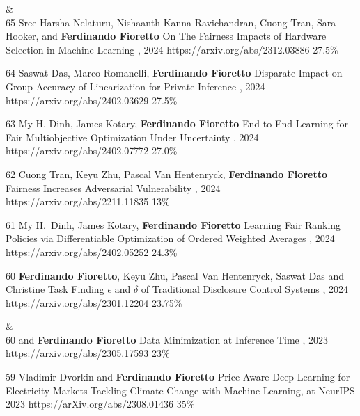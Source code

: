 \begin{pubs}

{}&\nemph{\rule{0.5\linewidth}{0.5pt}}\\[1em]

\confentry
	{65}
	{\student{} Sree Harsha Nelaturu, \student{} Nishaanth Kanna Ravichandran, \student{} Cuong Tran, Sara Hooker, and {\bf Ferdinando Fioretto}}
	{On The Fairness Impacts of Hardware Selection in Machine Learning}	
	{\procICML, 2024}
	{https://arxiv.org/abs/2312.03886}
	{27.5\%}

\confentry
	{64}
	{\student{} Saswat Das, Marco Romanelli, {\bf Ferdinando Fioretto}}
	{Disparate Impact on Group Accuracy of Linearization for Private Inference}
	{\procICML, 2024}
	{https://arxiv.org/abs/2402.03629}
	{27.5\%}

\confentry
	{63}
	{\student{}My H. Dinh, \student{} James Kotary, {\bf Ferdinando Fioretto}}
	{End-to-End Learning for Fair Multiobjective Optimization Under Uncertainty}
	{\procUAI, 2024}
	{https://arxiv.org/abs/2402.07772}
	{27.0\%}


\confentry
	{62}%
	{\student{}Cuong Tran, Keyu Zhu, Pascal Van Hentenryck, {\bf Ferdinando Fioretto}}
	{Fairness Increases Adversarial Vulnerability}
	{\procIJCAI, 2024}
	{https://arxiv.org/abs/2211.11835}
	{13\%}

\confentry
	{61}
	{\student{} My H.~Dinh, \student{} James Kotary, {\bf Ferdinando Fioretto}}
	{Learning Fair Ranking Policies via Differentiable Optimization of Ordered Weighted Averages}
	{\procFAccT, 2024}
	{https://arxiv.org/abs/2402.05252}
	{24.3\%}

\confentry
	{60}
	{{\bf Ferdinando Fioretto}, Keyu Zhu, Pascal Van Hentenryck, \student{} Saswat Das and Christine Task}
  	{Finding $\epsilon$ and $\delta$ of Traditional Disclosure Control Systems}
	{\procAAAI, 2024}
	{https://arxiv.org/abs/2301.12204}
	{23.75\%}

{}&\nemph{\rule{0.5\linewidth}{0.5pt}}\\[1em]

\confentry
	{60}
	{ and {\bf Ferdinando Fioretto}}
	{Data Minimization at Inference Time}
	{\procNeurIPS, 2023}
	{https://arxiv.org/abs/2305.17593}
	{23\%}

\confentry
	{59}
 	{Vladimir Dvorkin and {\bf Ferdinando Fioretto}}
  	{Price-Aware Deep Learning for Electricity Markets}
  	{Tackling Climate Change with Machine Learning, at NeurIPS 2023}
  	{https://arXiv.org/abs/2308.01436}
  	{35\%}


\end{pubs}
